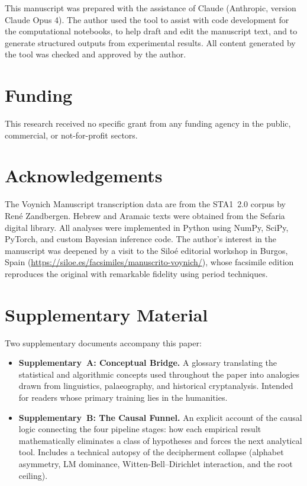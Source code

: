 This manuscript was prepared with the assistance of Claude (Anthropic, version Claude Opus 4).  The author used the tool to assist with code development for the computational notebooks, to help draft and edit the manuscript text, and to generate structured outputs from experimental results.  All content generated by the tool was checked and approved by the author.

\section*{Funding}

This research received no specific grant from any funding agency in the public, commercial, or not-for-profit sectors.

\section*{Acknowledgements}

The Voynich Manuscript transcription data are from the STA1~2.0 corpus by Ren\'e Zandbergen.  Hebrew and Aramaic texts were obtained from the Sefaria digital library.  All analyses were implemented in Python using NumPy, SciPy, PyTorch, and custom Bayesian inference code.  The author's interest in the manuscript was deepened by a visit to the Silo\'e editorial workshop in Burgos, Spain (\url{https://siloe.es/facsimiles/manuscrito-voynich/}), whose facsimile edition reproduces the original with remarkable fidelity using period techniques.


\section*{Supplementary Material}

Two supplementary documents accompany this paper:

\begin{itemize}[nosep]
  \item \textbf{Supplementary~A: Conceptual Bridge.}  A glossary translating the statistical and algorithmic concepts used throughout the paper into analogies drawn from linguistics, palaeography, and historical cryptanalysis.  Intended for readers whose primary training lies in the humanities.
  \item \textbf{Supplementary~B: The Causal Funnel.}  An explicit account of the causal logic connecting the four pipeline stages: how each empirical result mathematically eliminates a class of hypotheses and forces the next analytical tool.  Includes a technical autopsy of the decipherment collapse (alphabet asymmetry, LM dominance, Witten-Bell--Dirichlet interaction, and the root ceiling).
\end{itemize}

